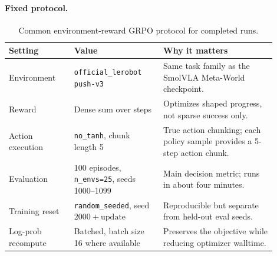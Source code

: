 \paragraph{Fixed protocol.}
\begin{table}[H]
\centering
\small
\begin{tabular}{p{0.22\linewidth}p{0.30\linewidth}p{0.38\linewidth}}
\toprule
Setting & Value & Why it matters \\
\midrule
Environment & \texttt{official\_lerobot} \texttt{push-v3} & Same task family as the SmolVLA Meta-World checkpoint. \\
Reward & Dense sum over steps & Optimizes shaped progress, not sparse success only. \\
Action execution & \texttt{no\_tanh}, chunk length 5 & True action chunking; each policy sample provides a 5-step action chunk. \\
Evaluation & 100 episodes, \texttt{n\_envs=25}, seeds 1000--1099 & Main decision metric; runs in about four minutes. \\
Training reset & \texttt{random\_seeded}, seed $2000+\mathrm{update}$ & Reproducible but separate from held-out eval seeds. \\
Log-prob recompute & Batched, batch size 16 where available & Preserves the objective while reducing optimizer walltime. \\
\bottomrule
\end{tabular}
\caption{Common environment-reward GRPO protocol for completed runs.}
\label{tab:env-grpo-protocol}
\end{table}

